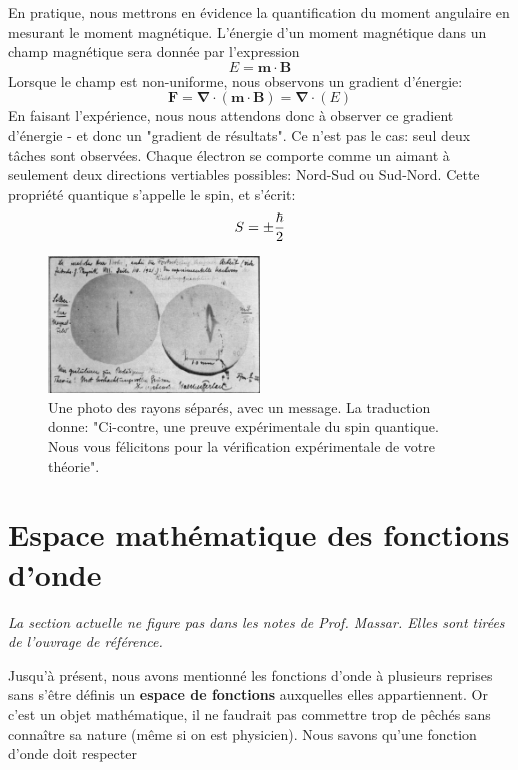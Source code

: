 \documentclass[../notesdecours.tex]{subfiles}
\begin{document}
En pratique, nous mettrons en évidence la quantification du moment angulaire en mesurant le moment magnétique. L'énergie d'un moment magnétique dans un champ magnétique sera donnée par l'expression
\begin{equation}
E = \bm{m}\cdot\bm{B}
\end{equation}
Lorsque le champ est non-uniforme, nous observons un gradient d'énergie:
\begin{equation}
\bm{F} = \bm{\nabla}\cdot(\bm{m}\cdot\bm{B}) = \bm{\nabla}\cdot(E)
\end{equation}
En faisant l'expérience, nous nous attendons donc à observer ce gradient d'énergie - et donc un "gradient de résultats". Ce n'est pas le cas: seul deux tâches sont observées. Chaque électron se comporte comme un aimant à seulement deux directions vertiables possibles: Nord-Sud ou Sud-Nord. Cette propriété quantique s'appelle le spin, et s'écrit:
\begin{equation}
S = \pm \frac{\hbar}{2}
\end{equation}

\begin{center}
\begin{figure}[h]
\centering
\includegraphics[width=0.50\textwidth]{exp.png}
\caption{Une photo des rayons séparés, avec un message. La traduction donne: "Ci-contre, une preuve expérimentale du spin quantique. Nous vous félicitons pour la vérification expérimentale de votre théorie".}
\end{figure}
\end{center}
\newpage
\section{Espace mathématique des fonctions d'onde}
\begin{center}
\textit{La section actuelle ne figure pas dans les notes de Prof. Massar. Elles sont tirées de l'ouvrage de référence.}
\end{center}
Jusqu'à présent, nous avons mentionné les fonctions d'onde à plusieurs reprises sans s'être définis un \textbf{espace de fonctions} auxquelles elles appartiennent. Or c'est un objet mathématique, il ne faudrait pas commettre trop de pêchés sans connaître sa nature (même si on est physicien). Nous savons qu'une fonction d'onde doit respecter 
\end{document}
